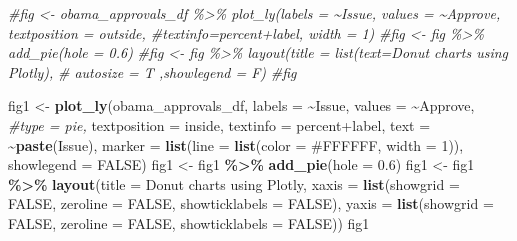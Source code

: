 \documentclass[
]{article}
\newenvironment{Shaded}{\begin{snugshade}}{\end{snugshade}}
\newcommand{\AttributeTok}[1]{\textcolor[rgb]{0.13,0.29,0.53}{#1}}
\newcommand{\CommentTok}[1]{\textcolor[rgb]{0.56,0.35,0.01}{\textit{#1}}}
\newcommand{\ConstantTok}[1]{\textcolor[rgb]{0.56,0.35,0.01}{#1}}
\newcommand{\DecValTok}[1]{\textcolor[rgb]{0.00,0.00,0.81}{#1}}
\newcommand{\FloatTok}[1]{\textcolor[rgb]{0.00,0.00,0.81}{#1}}
\newcommand{\FunctionTok}[1]{\textcolor[rgb]{0.13,0.29,0.53}{\textbf{#1}}}
\newcommand{\NormalTok}[1]{#1}
\newcommand{\OtherTok}[1]{\textcolor[rgb]{0.56,0.35,0.01}{#1}}
\newcommand{\SpecialCharTok}[1]{\textcolor[rgb]{0.81,0.36,0.00}{\textbf{#1}}}
\newcommand{\StringTok}[1]{\textcolor[rgb]{0.31,0.60,0.02}{#1}}
\begin{document}
\begin{Shaded}
\begin{Highlighting}[]
\CommentTok{\#fig \textless{}{-} obama\_approvals\_df \%\textgreater{}\% plot\_ly(labels = \textasciitilde{}Issue, values = \textasciitilde{}Approve, textposition = \textquotesingle{}outside\textquotesingle{}, \#textinfo=\textquotesingle{}percent+label\textquotesingle{}, width = 1)}
\CommentTok{\#fig \textless{}{-} fig \%\textgreater{}\% add\_pie(hole = 0.6)}
\CommentTok{\#fig \textless{}{-} fig \%\textgreater{}\% layout(title = list(text=\textquotesingle{}Donut charts using Plotly\textquotesingle{}), }
\CommentTok{\#                      autosize = T ,showlegend = F)}
\CommentTok{\#fig}


\NormalTok{fig1 }\OtherTok{\textless{}{-}} \FunctionTok{plot\_ly}\NormalTok{(obama\_approvals\_df, }\AttributeTok{labels =} \SpecialCharTok{\textasciitilde{}}\NormalTok{Issue, }\AttributeTok{values =} \SpecialCharTok{\textasciitilde{}}\NormalTok{Approve, }\CommentTok{\#type = \textquotesingle{}pie\textquotesingle{},}
        \AttributeTok{textposition =} \StringTok{\textquotesingle{}inside\textquotesingle{}}\NormalTok{,}
        \AttributeTok{textinfo =} \StringTok{\textquotesingle{}percent+label\textquotesingle{}}\NormalTok{,}
        \AttributeTok{text =} \SpecialCharTok{\textasciitilde{}}\FunctionTok{paste}\NormalTok{(Issue),}
        \AttributeTok{marker =} \FunctionTok{list}\NormalTok{(}\AttributeTok{line =} \FunctionTok{list}\NormalTok{(}\AttributeTok{color =} \StringTok{\textquotesingle{}\#FFFFFF\textquotesingle{}}\NormalTok{, }\AttributeTok{width =} \DecValTok{1}\NormalTok{)),}
        \AttributeTok{showlegend =} \ConstantTok{FALSE}\NormalTok{)}
\NormalTok{fig1 }\OtherTok{\textless{}{-}}\NormalTok{ fig1 }\SpecialCharTok{\%\textgreater{}\%} \FunctionTok{add\_pie}\NormalTok{(}\AttributeTok{hole =} \FloatTok{0.6}\NormalTok{)}
\NormalTok{fig1 }\OtherTok{\textless{}{-}}\NormalTok{ fig1 }\SpecialCharTok{\%\textgreater{}\%} \FunctionTok{layout}\NormalTok{(}\AttributeTok{title =} \StringTok{\textquotesingle{}Donut charts using Plotly\textquotesingle{}}\NormalTok{,}
         \AttributeTok{xaxis =} \FunctionTok{list}\NormalTok{(}\AttributeTok{showgrid =} \ConstantTok{FALSE}\NormalTok{, }\AttributeTok{zeroline =} \ConstantTok{FALSE}\NormalTok{, }\AttributeTok{showticklabels =} \ConstantTok{FALSE}\NormalTok{),}
         \AttributeTok{yaxis =} \FunctionTok{list}\NormalTok{(}\AttributeTok{showgrid =} \ConstantTok{FALSE}\NormalTok{, }\AttributeTok{zeroline =} \ConstantTok{FALSE}\NormalTok{, }\AttributeTok{showticklabels =} \ConstantTok{FALSE}\NormalTok{))}
\NormalTok{fig1}
\end{Highlighting}
\end{Shaded}
\end{document}
